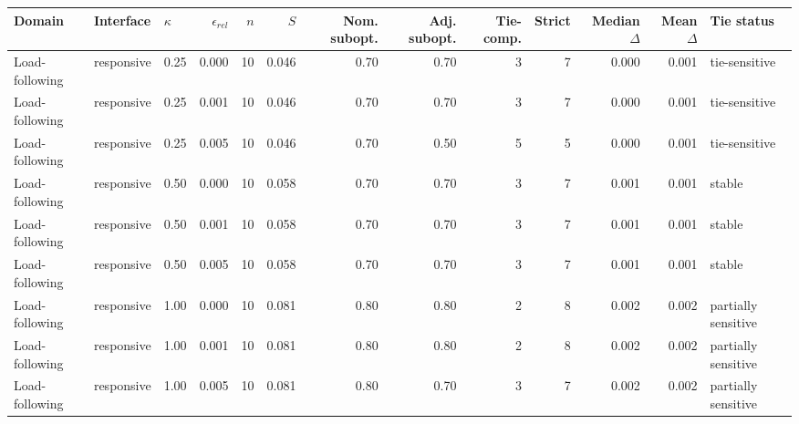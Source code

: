 \begin{tabular}{lllrrrrrrrrrl}
\toprule
Domain & Interface & $\kappa$ & $\epsilon_{rel}$ & $n$ & $S$ & Nom. subopt. & Adj. subopt. & Tie-comp. & Strict & Median $\Delta$ & Mean $\Delta$ & Tie status \\
\midrule
Load-following & responsive & 0.25 & 0.000 & 10 & 0.046 & 0.70 & 0.70 & 3 & 7 & 0.000 & 0.001 & tie-sensitive \\
Load-following & responsive & 0.25 & 0.001 & 10 & 0.046 & 0.70 & 0.70 & 3 & 7 & 0.000 & 0.001 & tie-sensitive \\
Load-following & responsive & 0.25 & 0.005 & 10 & 0.046 & 0.70 & 0.50 & 5 & 5 & 0.000 & 0.001 & tie-sensitive \\
Load-following & responsive & 0.50 & 0.000 & 10 & 0.058 & 0.70 & 0.70 & 3 & 7 & 0.001 & 0.001 & stable \\
Load-following & responsive & 0.50 & 0.001 & 10 & 0.058 & 0.70 & 0.70 & 3 & 7 & 0.001 & 0.001 & stable \\
Load-following & responsive & 0.50 & 0.005 & 10 & 0.058 & 0.70 & 0.70 & 3 & 7 & 0.001 & 0.001 & stable \\
Load-following & responsive & 1.00 & 0.000 & 10 & 0.081 & 0.80 & 0.80 & 2 & 8 & 0.002 & 0.002 & partially sensitive \\
Load-following & responsive & 1.00 & 0.001 & 10 & 0.081 & 0.80 & 0.80 & 2 & 8 & 0.002 & 0.002 & partially sensitive \\
Load-following & responsive & 1.00 & 0.005 & 10 & 0.081 & 0.80 & 0.70 & 3 & 7 & 0.002 & 0.002 & partially sensitive \\
\bottomrule
\end{tabular}
